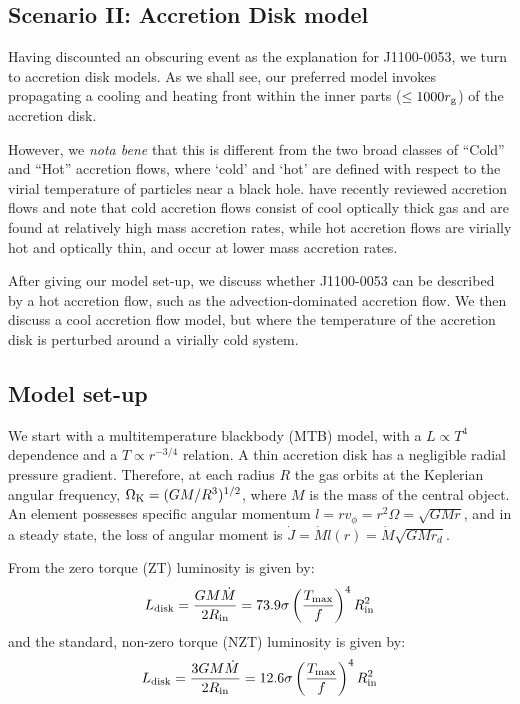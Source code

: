 \documentclass[11pt,a4paper]{article}
\begin{document}
\subsection*{Scenario II: Accretion Disk model}
Having discounted an obscuring event as the explanation for
J1100-0053, we turn to accretion disk models. As we shall 
see, our preferred model invokes propagating a cooling and 
heating front within the inner parts ($\leq 1000 r_{\rm g}$) 
of the accretion disk. 

However, we {\it nota bene} that this is different from the two broad
classes of ``Cold'' and ``Hot'' accretion flows, where `cold' and
`hot' are defined with respect to the virial temperature of particles
near a black hole.  \cite{YuanNarayan2014} have recently reviewed 
accretion flows and note that cold accretion flows consist of cool
optically thick gas and are found at relatively high mass accretion
rates, while hot accretion flows are virially hot and optically thin,
and occur at lower mass accretion rates.

After giving our model set-up, we discuss whether J1100-0053 can be
described by a hot accretion flow, such as the advection-dominated
accretion flow.  We then discuss a cool accretion flow model, but
where the temperature of the accretion disk is perturbed around a
virially cold system.


\subsection{Model set-up}
We start with a multitemperature blackbody (MTB) model, with a $L
\propto T^4$ dependence and a $T \propto r^{-3/4}$ relation. A thin
accretion disk has a negligible radial pressure gradient. Therefore,
at each radius $R$ the gas orbits at the Keplerian angular frequency,
$\Omega_{\rm K} = (GM/R^{3})^{1/2}$, where $M$ is the mass of the
central object.  An element possesses specific angular momentum $l = r
v_{\phi} = r^{2} \Omega = \sqrt{GMr}$, and in a steady state, the loss
of angular moment is $\dot{J} = \dot{M} l(r) = \dot{M}
\sqrt{GMr_{d}}$.



From \cite{Zimmerman2005} the zero torque (ZT) luminosity is given by:
\begin{equation}
L_{\rm disk}   =  \frac{G M \dot{M}}  {2 R_{\rm in}}    = 73.9 \sigma\left ( \frac{T_{\rm max}}{f}  \right )^{4}  R^{2}_{\rm in} 
\end{equation}
and the standard, non-zero torque (NZT) luminosity is given by:
\begin{equation}
L_{\rm disk} = \frac{3 G M \dot{M}}  {2 R_{\rm in}}    = 12.6 \sigma\left ( \frac{T_{\rm max}}{f}  \right )^{4}  R^{2}_{\rm in} 
\end{equation} 
\end{document}
